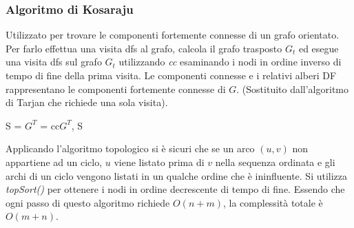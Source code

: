 \subsubsection{Algoritmo di Kosaraju}
Utilizzato per trovare le componenti fortemente connesse di un grafo orientato. Per farlo effettua una visita dfs al grafo, calcola il grafo trasposto $G_t$
ed esegue una visita dfs sul grafo $G_t$ utilizzando \emph{cc} esaminando i nodi in ordine inverso di tempo di fine della prima visita. Le componenti 
connesse e i relativi alberi DF rappresentano le componenti fortemente connesse di $G$. (Sostituito dall'algoritmo di Tarjan che richiede una sola visita).
\begin{algorithm}
\DontPrintSemicolon
{}

\caption{\protect\Int[] \protect{}}

\Stack S = 		
\Graph $G^T$ = 			
\Return cc{$G^T$, S}		
\end{algorithm}
Applicando l'algoritmo topologico si \`e sicuri che se un arco $(u, v)$ non appartiene ad un ciclo, $u$ viene listato prima di $v$ nella sequenza ordinata e
gli archi di un ciclo vengono listati in un qualche ordine che \`e ininfluente. Si utilizza \emph{topSort()} per ottenere i nodi in ordine decrescente di 
tempo di fine. Essendo che ogni passo di questo algoritmo richiede $O(n+m)$, la complessit\`a totale \`e $O(m+n)$.
